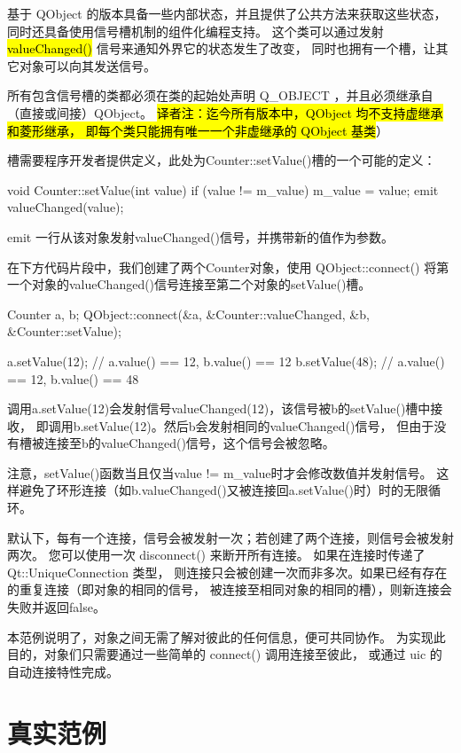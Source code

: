 基于 QObject 的版本具备一些内部状态，并且提供了公共方法来获取这些状态，
同时还具备使用信号槽机制的组件化编程支持。
这个类可以通过发射 \hl{valueChanged()} 信号来通知外界它的状态发生了改变，
同时也拥有一个槽，让其它对象可以向其发送信号。

所有包含信号槽的类都必须在类的起始处声明 Q\_OBJECT ，并且必须继承自（直接或间接）QObject。
\hl{译者注：迄今所有版本中，QObject 均不支持虚继承和菱形继承，
即每个类只能拥有唯一一个非虚继承的 QObject 基类}）

槽需要程序开发者提供定义，此处为Counter::setValue()槽的一个可能的定义：

\begin{cppcode}
void Counter::setValue(int value)
 {
     if (value != m_value) {
         m_value = value;
         emit valueChanged(value);
     }
 }
\end{cppcode}

emit 一行从该对象发射valueChanged()信号，并携带新的值作为参数。

在下方代码片段中，我们创建了两个Counter对象，使用 QObject::connect() 
将第一个对象的valueChanged()信号连接至第二个对象的setValue()槽。

\begin{cppcode}
Counter a, b;
QObject::connect(&a, &Counter::valueChanged,
                      &b, &Counter::setValue);

a.setValue(12);     // a.value() == 12, b.value() == 12
b.setValue(48);     // a.value() == 12, b.value() == 48
\end{cppcode}

调用a.setValue(12)会发射信号valueChanged(12)，该信号被b的setValue()槽中接收，
即调用b.setValue(12)。然后b会发射相同的valueChanged()信号，
但由于没有槽被连接至b的valueChanged()信号，这个信号会被忽略。

注意，setValue()函数当且仅当value != m\_value时才会修改数值并发射信号。
这样避免了环形连接（如b.valueChanged()又被连接回a.setValue()时）时的无限循环。

默认下，每有一个连接，信号会被发射一次；若创建了两个连接，则信号会被发射两次。
您可以使用一次 disconnect() 来断开所有连接。
如果在连接时传递了 Qt::UniqueConnection 类型，
则连接只会被创建一次而非多次。如果已经有存在的重复连接（即对象的相同的信号，
被连接至相同对象的相同的槽），则新连接会失败并返回false。

本范例说明了，对象之间无需了解对彼此的任何信息，便可共同协作。
为实现此目的，对象们只需要通过一些简单的 connect() 调用连接至彼此，
或通过 uic 的自动连接特性完成。

\section{真实范例}

